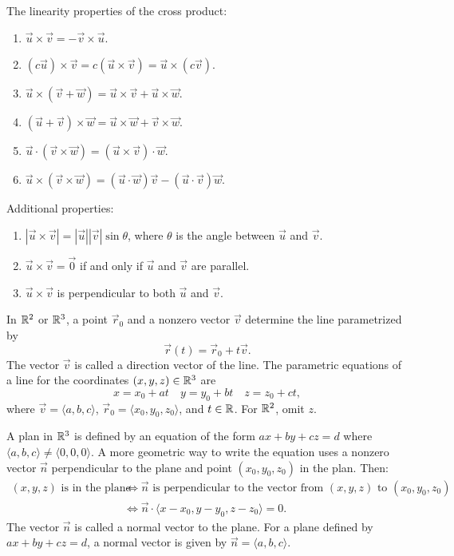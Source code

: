 \begin{facts}
	The linearity properties of the cross product:
	\begin{enumerate}
		\item $\vec{u} \times \vec{v} = -\vec{v} \times \vec{u}$.
		\item $(c \vec{u}) \times \vec{v} = c(\vec{u} \times \vec{v}) = \vec{u}
			\times (c \vec{v})$.
		\item $\vec{u} \times (\vec{v} + \vec{w}) = \vec{u} \times \vec{v} + \vec{u}
			\times \vec{w}$.
		\item $(\vec{u} + \vec{v}) \times \vec{w} = \vec{u} \times \vec{w} + \vec{v}
			\times \vec{w}$.
		\item $\vec{u} \cdot (\vec{v} \times \vec{w}) = (\vec{u} \times \vec{v})
			\cdot \vec{w}$.
		\item $\vec{u} \times (\vec{v} \times \vec{w}) = (\vec{u} \cdot \vec{w})
			\vec{v} - (\vec{u} \cdot \vec{v}) \vec{w}$.
	\end{enumerate}
	Additional properties:
	\begin{enumerate}
		\item $|\vec{u} \times \vec{v}| = |\vec{u}| |\vec{v}| \sin \theta$, where
			$\theta$ is the angle between $\vec{u}$ and $\vec{v}$.
		\item $\vec{u} \times \vec{v} = \vec{0}$ if and only if $\vec{u}$ and
			$\vec{v}$ are parallel.
		\item $\vec{u} \times \vec{v}$ is perpendicular to both $\vec{u}$ and
			$\vec{v}$.
	\end{enumerate}
\end{facts}

\begin{definition}
	In ${\mathbb{R}}^2$ or ${\mathbb{R}}^3$, a point $\vec{r}_0$ and a nonzero vector $\vec{v}$
	determine the line parametrized by
	\[
		\vec{r}(t) = \vec{r}_0 + t \vec{v}.
	\]
	The vector $\vec{v}$ is called a direction vector of the line. The parametric
	equations of a line for the coordinates $(x, y, z) \in {\mathbb{R}}^3$ are
	\[
		x = x_0 + at \quad y = y_0 + bt \quad z = z_0 + ct,
	\]
	where $\vec{v} = \langle a, b, c \rangle$, $\vec{r}_0 = \langle x_0, y_0, z_0
	\rangle$, and $t \in {\mathbb{R}}$. For ${\mathbb{R}}^2$, omit $z$.
\end{definition}

\begin{definition}
	A plan in ${\mathbb{R}}^3$ is defined by an equation of the form $ax + by + cz = d$
	where $\langle a, b, c \rangle \neq \langle 0, 0, 0 \rangle$. A more geometric
	way to write the equation uses a nonzero vector $\vec{n}$ perpendicular to the
	plane and point $(x_0, y_0, z_0)$ in the plan. Then:
	\begin{align*}
		(x, y, z) \text{ is in the plane } &\Longleftrightarrow \vec{n} \text{ is
		perpendicular to the vector from } (x, y, z) \text{ to } (x_0, y_0, z_0) \\
		&\Longleftrightarrow \vec{n} \cdot \langle x - x_0, y - y_0, z - z_0 \rangle
		= 0.
	\end{align*}
	The vector $\vec{n}$ is called a normal vector to the plane. For a plane
	defined by $ax + by +cz = d$, a normal vector is given by $\vec{n} = \langle
	a, b, c \rangle$.
\end{definition}

